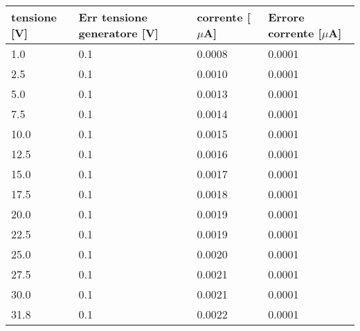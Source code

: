 \begin{tabular}{llll}
\toprule
tensione [V] & Err tensione generatore [V] & corrente [$\mu$A] & Errore corrente [$\mu$A] \\
\midrule
1.0 & 0.1 & 0.0008 & 0.0001 \\
2.5 & 0.1 & 0.0010 & 0.0001 \\
5.0 & 0.1 & 0.0013 & 0.0001 \\
7.5 & 0.1 & 0.0014 & 0.0001 \\
10.0 & 0.1 & 0.0015 & 0.0001 \\
12.5 & 0.1 & 0.0016 & 0.0001 \\
15.0 & 0.1 & 0.0017 & 0.0001 \\
17.5 & 0.1 & 0.0018 & 0.0001 \\
20.0 & 0.1 & 0.0019 & 0.0001 \\
22.5 & 0.1 & 0.0019 & 0.0001 \\
25.0 & 0.1 & 0.0020 & 0.0001 \\
27.5 & 0.1 & 0.0021 & 0.0001 \\
30.0 & 0.1 & 0.0021 & 0.0001 \\
31.8 & 0.1 & 0.0022 & 0.0001 \\
\bottomrule
\end{tabular}
